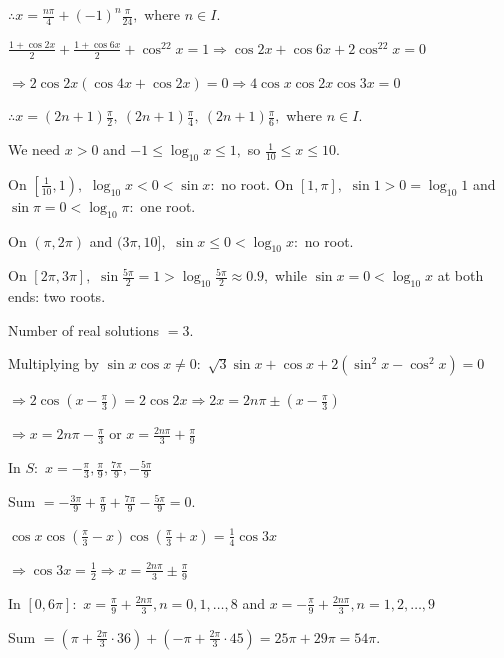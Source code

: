   $\therefore x = \frac{n\pi}{4} + (-1)^n\frac{\pi}{24},$ where $n\in I.$

\item $\frac{1 + \cos2x}{2} + \frac{1 + \cos6x}{2} + \cos^22x = 1 \Rightarrow \cos2x + \cos6x + 2\cos^22x = 0$

  $\Rightarrow 2\cos2x(\cos4x + \cos2x) = 0 \Rightarrow 4\cos x\cos2x\cos3x = 0$

  $\therefore x = (2n + 1)\frac{\pi}{2},~(2n + 1)\frac{\pi}{4},~(2n + 1)\frac{\pi}{6},$ where $n\in I.$

\item We need $x > 0$ and $-1\leq\log_{10}x\leq 1,$ so $\frac{1}{10}\leq x\leq 10.$

  On $\left[\frac{1}{10}, 1\right),$ $\log_{10}x < 0 < \sin x:$ no root. On $\left[1, \pi\right],$ $\sin 1 > 0 =
  \log_{10}1$ and $\sin\pi = 0 < \log_{10}\pi:$ one root.

  On $(\pi, 2\pi)$ and $(3\pi, 10],$ $\sin x\leq 0 < \log_{10}x:$ no root.

  On $[2\pi, 3\pi],$ $\sin\frac{5\pi}{2} = 1 > \log_{10}\frac{5\pi}{2}\approx 0.9,$ while $\sin x = 0 < \log_{10}x$ at both
  ends: two roots.

  Number of real solutions $= 3.$

\item Multiplying by $\sin x\cos x\neq 0:$ $\sqrt{3}\sin x + \cos x + 2(\sin^2x - \cos^2x) = 0$

  $\Rightarrow 2\cos\left(x - \frac{\pi}{3}\right) = 2\cos2x \Rightarrow 2x = 2n\pi\pm\left(x - \frac{\pi}{3}\right)$

  $\Rightarrow x = 2n\pi - \frac{\pi}{3}$ or $x = \frac{2n\pi}{3} + \frac{\pi}{9}$

  In $S:$ $x = -\frac{\pi}{3}, \frac{\pi}{9}, \frac{7\pi}{9}, -\frac{5\pi}{9}$

  Sum $= -\frac{3\pi}{9} + \frac{\pi}{9} + \frac{7\pi}{9} - \frac{5\pi}{9} = 0.$

\item $\cos x\cos\left(\frac{\pi}{3} - x\right)\cos\left(\frac{\pi}{3} + x\right) = \frac{1}{4}\cos3x$

  $\Rightarrow \cos3x = \frac{1}{2} \Rightarrow x = \frac{2n\pi}{3}\pm\frac{\pi}{9}$

  In $[0, 6\pi]:$ $x = \frac{\pi}{9} + \frac{2n\pi}{3}, n = 0, 1, \ldots, 8$ and $x = -\frac{\pi}{9} + \frac{2n\pi}{3}, n = 1,
  2, \ldots, 9$

  Sum $= \left(\pi + \frac{2\pi}{3}\cdot 36\right) + \left(-\pi + \frac{2\pi}{3}\cdot 45\right) = 25\pi + 29\pi = 54\pi.$

